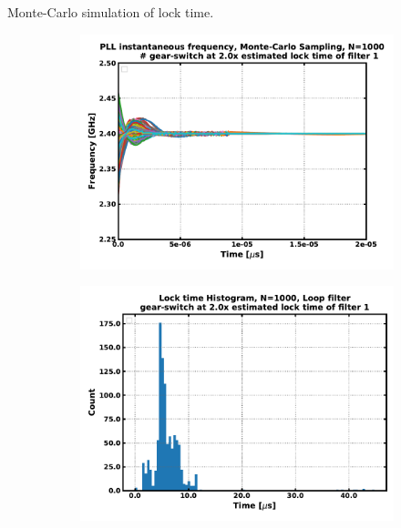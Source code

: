 \documentclass[t, screen, aspectratio=43]{beamer}
\begin{document}
\begin{frame}
\begin{block}{Monte-Carlo simulation of lock time.}
	\begin{figure}[htb!]
	    \centering
	    \begin{subfigure}{0.5\textwidth}
	        \centering
	        \center\includegraphics[width=1.0\textwidth, angle=0]{./figs/mc_trans_2x.pdf}
	        \label{fig:mc_trans_fast}
	    \end{subfigure}%
	    \begin{subfigure}{0.5\textwidth}
	        \centering
	        \center\includegraphics[width=1.0\textwidth, angle=0]{figs/mc_hist_fast_2x.pdf}
	        \label{fig:mc_hist_fast}
	    \end{subfigure}
	    \label{fig:mc_sim_fast}
	\end{figure}
	\end{block}	
\end{frame}
\end{document}
